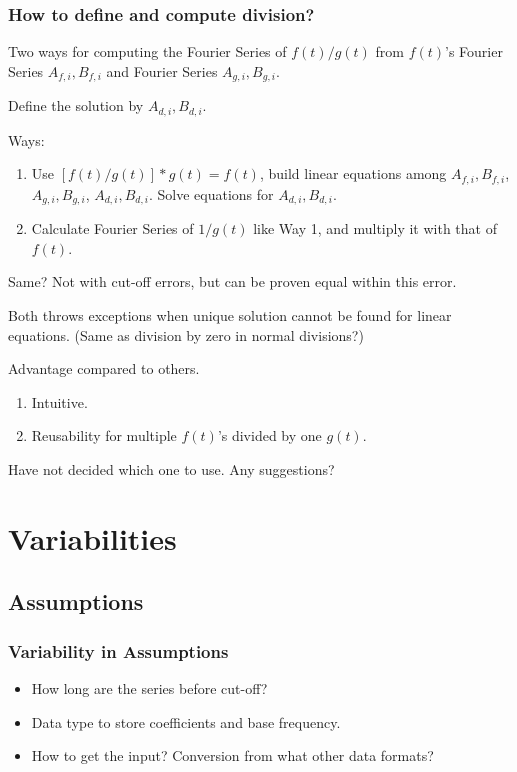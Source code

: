 \documentclass{beamer}
\begin{document}
	\begin{frame}
		\frametitle{How to define and compute division?}
		Two ways for computing the Fourier Series of $f(t)/g(t)$ from $f(t)$'s Fourier Series $A_{f,i}, B_{f,i}$ and Fourier Series $A_{g,i}, B_{g,i}$.
		
		Define the solution by $A_{d,i}, B_{d,i}$.
		
		Ways:
		\begin{enumerate}[W{a}y 1.]
		\item Use $[f(t)/g(t)] * g(t) = f(t)$, build linear equations among $A_{f,i}, B_{f,i}$, $A_{g,i}, B_{g,i}$, $A_{d,i}, B_{d,i}$. Solve equations for $A_{d,i}, B_{d,i}$.

		\item Calculate Fourier Series of $1/g(t)$ like Way 1, and multiply it with that of $f(t)$.
		\end{enumerate}
		Same? Not with cut-off errors, but can be proven equal within this error.
		
		Both throws exceptions when unique solution cannot be found for linear equations. (Same as division by zero in normal divisions?)
		
		Advantage compared to others.
		\begin{enumerate}[W{a}y 1.]
			\item Intuitive.
			\item Reusability for multiple $f(t)$'s divided by one $g(t)$.
		\end{enumerate}
		Have not decided which one to use. Any suggestions?
		
	\end{frame}

	\section{Variabilities}
		\subsection{Assumptions}
		\begin{frame}
		\frametitle{Variability in Assumptions}
		\begin{itemize}
			\item How long are the series before cut-off?
			\item Data type to store coefficients and base frequency.
			\item How to get the input? Conversion from what other data formats?
		\end{itemize}
		\end{frame}
	
\end{document}
